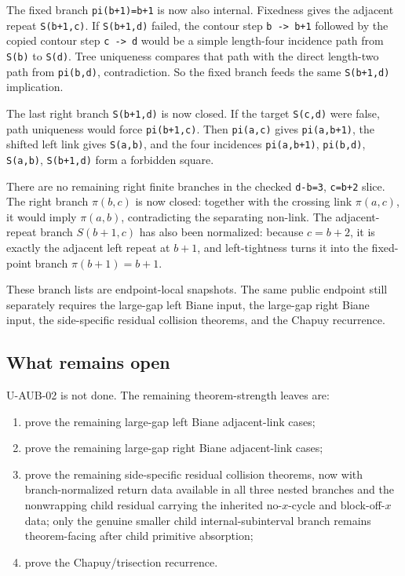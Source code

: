 \documentclass[
]{article}
\providecommand{\tightlist}{%
  \setlength{\itemsep}{0pt}\setlength{\parskip}{0pt}}
\begin{document}
The fixed branch \texttt{pi(b+1)=b+1} is now also internal. Fixedness
gives the adjacent repeat \texttt{S(b+1,c)}. If \texttt{S(b+1,d)}
failed, the contour step \texttt{b\ -\textgreater{}\ b+1} followed by
the copied contour step \texttt{c\ -\textgreater{}\ d} would be a simple
length-four incidence path from \texttt{S(b)} to \texttt{S(d)}. Tree
uniqueness compares that path with the direct length-two path from
\texttt{pi(b,d)}, contradiction. So the fixed branch feeds the same
\texttt{S(b+1,d)} implication.

The last right branch \texttt{S(b+1,d)} is now closed. If the target
\texttt{S(c,d)} were false, path uniqueness would force
\texttt{pi(b+1,c)}. Then \texttt{pi(a,c)} gives \texttt{pi(a,b+1)}, the
shifted left link gives \texttt{S(a,b)}, and the four incidences
\texttt{pi(a,b+1)}, \texttt{pi(b,d)}, \texttt{S(a,b)}, \texttt{S(b+1,d)}
form a forbidden square.

There are no remaining right finite branches in the checked
\texttt{d-b=3}, \texttt{c=b+2} slice. The right branch \(\pi(b,c)\) is
now closed: together with the crossing link \(\pi(a,c)\), it would imply
\(\pi(a,b)\), contradicting the separating non-link. The adjacent-repeat
branch \(S(b+1,c)\) has also been normalized: because \(c=b+2\), it is
exactly the adjacent left repeat at \(b+1\), and left-tightness turns it
into the fixed-point branch \(\pi(b+1)=b+1\).

These branch lists are endpoint-local snapshots. The same public
endpoint still separately requires the large-gap left Biane input, the
large-gap right Biane input, the side-specific residual collision
theorems, and the Chapuy recurrence.

\subsection{What remains open}\label{what-remains-open}

U-AUB-02 is not done. The remaining theorem-strength leaves are:

\begin{enumerate}
\def\labelenumi{\arabic{enumi}.}
\tightlist
\item
  prove the remaining large-gap left Biane adjacent-link cases;
\item
  prove the remaining large-gap right Biane adjacent-link cases;
\item
  prove the remaining side-specific residual collision theorems, now
  with branch-normalized return data available in all three nested
  branches and the nonwrapping child residual carrying the inherited
  no-\(x\)-cycle and block-off-\(x\) data; only the genuine smaller
  child internal-subinterval branch remains theorem-facing after child
  primitive absorption;
\item
  prove the Chapuy/trisection recurrence.
\end{enumerate}
\end{document}
